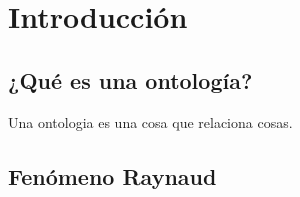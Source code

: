 \section{Introducción}

\subsection{¿Qué es una ontología?}
Una ontologia es una cosa que relaciona cosas.
\subsection{Fenómeno Raynaud}